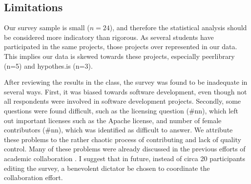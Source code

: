 \subsection{Limitations}
\label{sec:limitations}

Our survey sample is small ($n=24$), and therefore the statistical analysis should be considered more indicatory than rigorous. As several students have participated in the same projects, those projects over represented in our data. This implies our data is skewed towards these projects, especially peerlibrary (n=5) and hypothes.is (n=3).

After reviewing the results in the class, the survey was found to be inadequate in several ways. First, it was biased towards software development, even though not all respondents were involved in software development projects. Secondly, some questions were found difficult, such as the licensing question (\#nn), which left out important licenses such as the Apache license, and number of female contributors (\#nn), which was identified as difficult to answer. We attribute these problems to the rather chaotic process of contributing and lack of quality control.  Many of these problems were already discussed in the previous efforts of academic collaboration \cite{Tomlinson2012}. I suggest that in future, instead of circa 20 participants editing the survey, a benevolent dictator be chosen to coordinate the collaboration effort.



